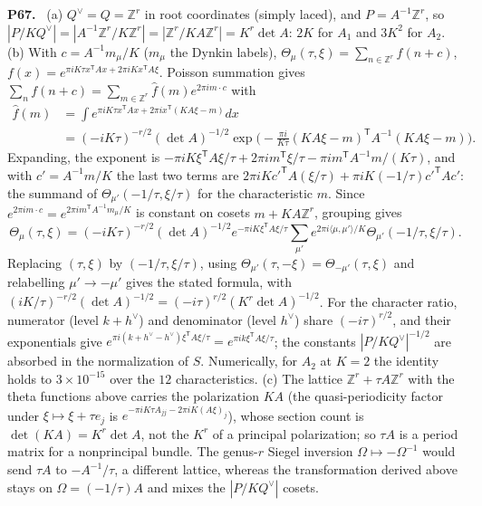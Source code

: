 \documentclass[11pt]{article}
\newcommand{\Z}{\mathbb{Z}}
\newenvironment{solution}[1]{\medskip\noindent\textbf{P#1.}\ }{\par\medskip}
\begin{document}
\begin{solution}{67}
(a) $Q^\vee = Q = \Z^r$ in root coordinates (simply laced), and $P = A^{-1}\Z^r$,
so $|P/KQ^\vee| = |A^{-1}\Z^r/K\Z^r| = |\Z^r/KA\Z^r| = K^r\det A$: $2K$ for $A_1$ and
$3K^2$ for $A_2$. (b) With $c = A^{-1}m_\mu/K$ ($m_\mu$ the Dynkin labels),
$\Theta_\mu(\tau,\xi) = \sum_{n\in\Z^r}f(n+c)$, $f(x) = e^{\pi iK\tau x^{\mathsf T}Ax+2\pi iKx^{\mathsf T}A\xi}$.
Poisson summation gives $\sum_nf(n+c) = \sum_{m\in\Z^r}\hat f(m)e^{2\pi im\cdot c}$
with
\begin{align*}
 \hat f(m) &= \int e^{\pi iK\tau x^{\mathsf T}Ax+2\pi ix^{\mathsf T}(KA\xi-m)}dx\\
 &= (-iK\tau)^{-r/2}(\det A)^{-1/2}\exp\!\big(-\tfrac{\pi i}{K\tau}(KA\xi-m)^{\mathsf T}A^{-1}(KA\xi-m)\big).
\end{align*}
Expanding, the exponent is $-\pi iK\xi^{\mathsf T}A\xi/\tau+2\pi im^{\mathsf T}\xi/\tau-\pi im^{\mathsf T}A^{-1}m/(K\tau)$,
and with $c' = A^{-1}m/K$ the last two terms are $2\pi iKc'^{\mathsf T}A(\xi/\tau)+\pi iK(-1/\tau)c'^{\mathsf T}Ac'$:
the summand of $\Theta_{\mu'}(-1/\tau,\xi/\tau)$ for the characteristic $m$.
Since $e^{2\pi im\cdot c} = e^{2\pi im^{\mathsf T}A^{-1}m_\mu/K}$ is constant on
cosets $m+KA\Z^r$, grouping gives
\[
 \Theta_\mu(\tau,\xi) = (-iK\tau)^{-r/2}(\det A)^{-1/2}e^{-\pi iK\xi^{\mathsf T}A\xi/\tau}\sum_{\mu'}e^{2\pi i\langle\mu,\mu'\rangle/K}\Theta_{\mu'}(-1/\tau,\xi/\tau).
\]
Replacing $(\tau,\xi)$ by $(-1/\tau,\xi/\tau)$, using $\Theta_{\mu'}(\tau,-\xi) = \Theta_{-\mu'}(\tau,\xi)$
and relabelling $\mu'\to-\mu'$ gives the stated formula, with
$(iK/\tau)^{-r/2}(\det A)^{-1/2} = (-i\tau)^{r/2}(K^r\det A)^{-1/2}$. For the
character ratio, numerator (level $k+h^\vee$) and denominator (level $h^\vee$)
share $(-i\tau)^{r/2}$, and their exponentials give
$e^{\pi i(k+h^\vee-h^\vee)\xi^{\mathsf T}A\xi/\tau} = e^{\pi ik\xi^{\mathsf T}A\xi/\tau}$;
the constants $|P/KQ^\vee|^{-1/2}$ are absorbed in the normalization of $S$.
Numerically, for $A_2$ at $K = 2$ the identity holds to $3\times10^{-15}$ over
the $12$ characteristics. (c) The lattice $\Z^r+\tau A\Z^r$ with the theta
functions above carries the polarization $KA$ (the quasi-periodicity factor
under $\xi\mapsto\xi+\tau e_j$ is $e^{-\pi iK\tau A_{jj}-2\pi iK(A\xi)_j}$), whose
section count is $\det(KA) = K^r\det A$, not the $K^r$ of a principal
polarization; so $\tau A$ is a period matrix for a nonprincipal bundle. The
genus-$r$ Siegel inversion $\Omega\mapsto-\Omega^{-1}$ would send $\tau A$ to
$-A^{-1}/\tau$, a different lattice, whereas the transformation derived above
stays on $\Omega = (-1/\tau)A$ and mixes the $|P/KQ^\vee|$ cosets.
\end{solution}
\end{document}
